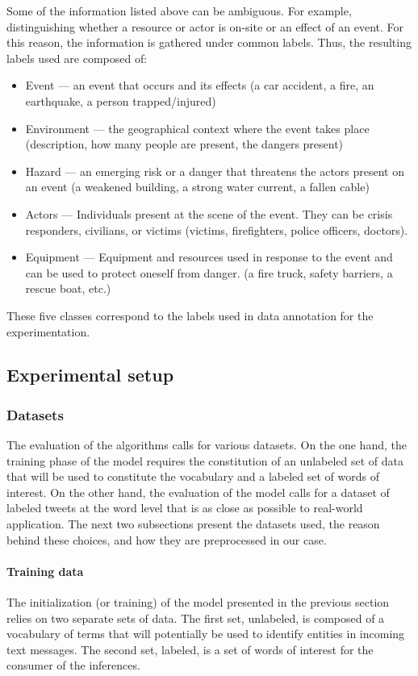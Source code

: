 Some of the information listed above can be ambiguous.
For example, distinguishing whether a resource or actor is on-site or an effect of an event.
For this reason, the information is gathered under common labels.
Thus, the resulting labels used are composed of:

\begin{itemize}
    \item Event — an event that occurs and its effects (a car accident, a fire, an earthquake, a person trapped/injured)
    \item Environment — the geographical context where the event takes place (description, how many people are present, the dangers present)
    \item Hazard — an emerging risk or a danger that threatens the actors present on an event (a weakened building, a strong water current, a fallen cable)
    \item Actors — Individuals present at the scene of the event. They can be crisis responders, civilians, or victims (victims, firefighters, police officers, doctors).
    \item Equipment — Equipment and resources used in response to the event and can be used to protect oneself from danger. (a fire truck, safety barriers, a rescue boat, etc.)
\end{itemize}

These five classes correspond to the labels used in data annotation for the experimentation.

\subsection{Experimental setup}
\subsubsection{Datasets}
The evaluation of the algorithms calls for various datasets.
On the one hand, the training phase of the model requires the constitution of an unlabeled set of data that will be used to constitute the vocabulary and a labeled set of words of interest.
On the other hand, the evaluation of the model calls for a dataset of labeled tweets at the word level that is as close as possible to real-world application.
The next two subsections present the datasets used, the reason behind these choices, and how they are preprocessed in our case.

\paragraph{Training data}
The initialization (or training) of the model presented in the previous section relies on two separate sets of data.
The first set, unlabeled, is composed of a vocabulary of terms that will potentially be used to identify entities in incoming text messages.
The second set, labeled, is a set of words of interest for the consumer of the inferences.

